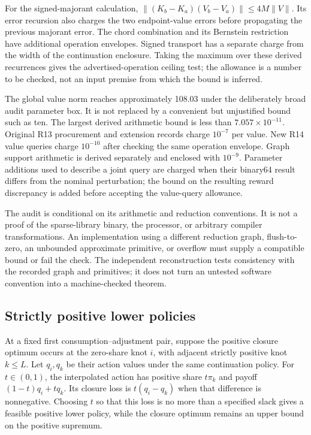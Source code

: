 For the signed-majorant calculation, $\|(K_b-K_a)(V_b-V_a)\|\leq4M\|V\|$. Its error recursion also charges the two endpoint-value errors before propagating the previous majorant error. The chord combination and its Bernstein restriction have additional operation envelopes. Signed transport has a separate charge from the width of the continuation enclosure. Taking the maximum over these derived recurrences gives the advertised-operation ceiling test; the allowance is a number to be checked, not an input premise from which the bound is inferred.



The global value norm reaches approximately 108.03 under the deliberately broad audit parameter box. It is not replaced by a convenient but unjustified bound such as ten. The largest derived arithmetic bound is less than $7.057\times10^{-11}$. Original R13 procurement and extension records charge $10^{-7}$ per value. New R14 value queries charge $10^{-10}$ after checking the same operation envelope. Graph support arithmetic is derived separately and enclosed with $10^{-9}$. Parameter additions used to describe a joint query are charged when their binary64 result differs from the nominal perturbation; the bound on the resulting reward discrepancy is added before accepting the value-query allowance.

The audit is conditional on its arithmetic and reduction conventions. It is not a proof of the sparse-library binary, the processor, or arbitrary compiler transformations. An implementation using a different reduction graph, flush-to-zero, an unbounded approximate primitive, or overflow must supply a compatible bound or fail the check. The independent reconstruction tests consistency with the recorded graph and primitives; it does not turn an untested software convention into a machine-checked theorem.

\subsection{Strictly positive lower policies}
At a fixed first consumption--adjustment pair, suppose the positive closure optimum occurs at the zero-share knot $i$, with adjacent strictly positive knot $k\leq L$. Let $q_i,q_k$ be their action values under the same continuation policy. For $t\in(0,1)$, the interpolated action has positive share $t\pi_k$ and payoff $(1-t)q_i+tq_k$. Its closure loss is $t(q_i-q_k)$ when that difference is nonnegative. Choosing $t$ so that this loss is no more than a specified slack gives a feasible positive lower policy, while the closure optimum remains an upper bound on the positive supremum.

